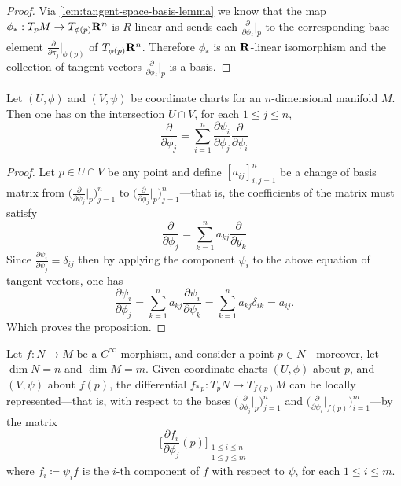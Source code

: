 \begin{proof}
Via \cref{lem:tangent-space-basis-lemma} we know that the map
\(\phi_{*}: T_p M \to T_{\phi(p)} \mathbf{R}^n\) is \(R\)-linear and sends each
\(\frac{\partial}{\partial \phi_j}\big|_p\) to the corresponding base element
\(\frac{\partial}{\partial \pi_j}\big|_{\phi(p)}\) of \(T_{\phi(p)}
\mathbf{R}^n\). Therefore \(\phi_{*}\) is an \(\mathbf{R}\)-linear isomorphism and the
collection of tangent vectors \(\frac{\partial}{\partial \phi_j}\big|_p\) is a
basis.
\end{proof}

\begin{proposition}
\label{prop:transition-matrix}
Let \((U, \phi)\) and \((V, \psi)\) be coordinate charts for an
\(n\)-dimensional manifold \(M\). Then one has on the intersection \(U \cap V\),
for each \(1 \leq j \leq n\),
\[
\frac{\partial}{\partial \phi_j}
= \sum_{i=1}^n \frac{\partial \psi_i}{\partial \phi_j}
\frac{\partial}{\partial \psi_i}
\]
\end{proposition}

\begin{proof}
Let \(p \in U \cap V\) be any point and define \([a_{ij}]_{i, j = 1}^n\)
be a change of basis matrix from
\(\big(\frac{\partial}{\partial \psi_j}\big|_p\big)_{j=1}^n\) to
\(\big(\frac{\partial}{\partial \phi_j}\big|_p\big)_{j=1}^n\)---that is, the
coefficients of the matrix must satisfy
\[
\frac{\partial}{\partial \phi_{j}}
= \sum_{k=1}^n a_{kj}\frac{\partial}{\partial y_k}
\]
Since \(\frac{\partial \psi_i}{\partial \psi_j} = \delta_{ij}\) then by
applying the component \(\psi_i\) to the above equation of tangent vectors, one
has
\[
\frac{\partial \psi_i}{\partial \phi_j}
= \sum_{k=1}^n a_{k j} \frac{\partial \psi_i}{\partial \psi_k}
= \sum_{k=1}^n a_{k j} \delta_{i k}
= a_{i j}.
\]
Which proves the proposition.
\end{proof}

\begin{proposition}
\label{prop:local-expression-differential}
Let \(f: N \to M\) be a \(C^{\infty}\)-morphism, and consider a point
\(p \in N\)---moreover, let \(\dim N = n\) and \(\dim M = m\). Given coordinate
charts \((U, \phi)\) about \(p\), and \((V, \psi)\) about \(f(p)\), the
differential \(f_{*\, p}: T_p N \to T_{f(p)} M\) can be locally
represented---that is, with respect to the bases
\(\big(\frac{\partial}{\partial \phi_j}\big|_p\big)_{j=1}^n\) and
\(\big(\frac{\partial}{\partial \psi_i}\big|_{f(p)}\big)_{i=1}^m\)---by the
matrix
\[
\Big[
\frac{\partial f_i}{\partial \phi_j}(p)
\Big]_{\substack{1 \leq i \leq n \\ 1 \leq j \leq m}}
\]
where \(f_i \coloneq \psi_i f\) is the \(i\)-th component of \(f\) with respect
to \(\psi\), for each \(1 \leq i \leq m\).
\end{proposition}

